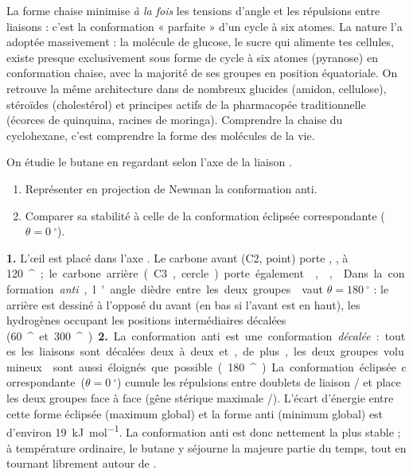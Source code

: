 \documentclass[11pt]{article}
\providecommand{\degree}{^{\circ}}
\newcommand{\cle}[1]{{\popxbold\color{popdark}#1}}
\begin{document}
\begin{savaistu}
La forme chaise minimise \emph{à la fois} les tensions d'angle et les répulsions entre liaisons : c'est la conformation « parfaite » d'un cycle à six atomes. La nature l'a adoptée massivement : la molécule de \cle{glucose}, le sucre qui alimente tes cellules, existe presque exclusivement sous forme de cycle à six atomes (pyranose) en conformation chaise, avec la majorité de ses groupes  en position équatoriale. On retrouve la même architecture dans de nombreux glucides (amidon, cellulose), stéroïdes (cholestérol) et principes actifs de la pharmacopée traditionnelle (écorces de quinquina, racines de moringa). Comprendre la chaise du cyclohexane, c'est comprendre la forme des molécules de la vie.
\end{savaistu}

\begin{exoresolu}
On étudie le butane  en regardant selon l'axe de la liaison .
\begin{enumerate}
\item Représenter en projection de Newman la conformation anti.
\item Comparer sa stabilité à celle de la conformation éclipsée correspondante ($\theta = \SI{0}{\degree}$).
\end{enumerate}
\tcblower
\textbf{1.} L'\oe il est placé dans l'axe . Le carbone avant (C2, point) porte , ,  à \SI{120}{\degree} ; le carbone arrière (C3, cercle) porte également , , . Dans la conformation \emph{anti}, l'angle dièdre entre les deux groupes  vaut $\theta = \SI{180}{\degree}$ : le  arrière est dessiné à l'opposé du  avant (en bas si l'avant est en haut), les hydrogènes occupant les positions intermédiaires décalées (\SI{60}{\degree} et \SI{300}{\degree}).

\textbf{2.} La conformation anti est une conformation \emph{décalée} : toutes les liaisons sont décalées deux à deux et, de plus, les deux groupes volumineux  sont aussi éloignés que possible (\SI{180}{\degree}). La conformation éclipsée correspondante ($\theta = \SI{0}{\degree}$) cumule les répulsions entre doublets de liaison / et place les deux groupes  face à face (gêne stérique maximale /). L'écart d'énergie entre cette forme éclipsée (maximum global) et la forme anti (minimum global) est d'environ \SI{19}{kJ.mol^{-1}}. La conformation anti est donc nettement la plus stable ; à température ordinaire, le butane y séjourne la majeure partie du temps, tout en tournant librement autour de .
\end{exoresolu}
\end{document}
